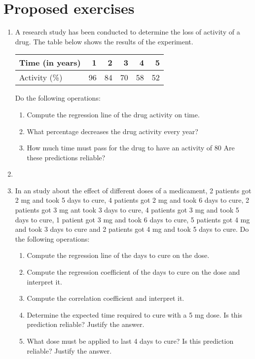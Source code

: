 \section{Proposed exercises}
\begin{enumerate}[leftmargin=*]
\item A research study has been conducted to determine the loss of activity of a drug.
The table below shows the results of the experiment.

\begin{center}
\begin{tabular}{|l|r|r|r|r|r|}
\hline
Time (in years) & 1 & 2 & 3 & 4 & 5 \\ \hline
Activity (\%) & 96 & 84 & 70 & 58 & 52 \\ \hline
\end{tabular}
\end{center}
Do the following operations:
\begin{enumerate}
\item Compute the regression line of the drug activity on time.
\item What percentage decreases the drug activity every year?  
\item How much time must pass for the drug to have an activity of 80%
Are these predictions reliable?
\end{enumerate}

\item \item In an study about the effect of different doses of a medicament, 2 patients got 2 mg and took 5 days to cure, 4
patients got 2 mg and took 6 days to cure, 2 patients got 3 mg ant took 3 days to cure, 4 patients got 3 mg and took 5
days to cure, 1 patient got 3 mg and took 6 days to cure, 5 patients got 4 mg and took 3 days to cure and 2 patients got
4 mg and took 5 days to cure. 
Do the following operations:
\begin{enumerate}
\item Compute the regression line of the days to cure on the dose.
\item Compute the regression coefficient of the days to cure on the dose and interpret it.
\item Compute the correlation coefficient and interpret it.
\item Determine the expected time required to cure with a 5 mg dose.
Is this prediction reliable? Justify the answer.
\item What dose must be applied to last 4 days to cure? 
Is this prediction reliable? Justify the answer.
\end{enumerate}


\end{enumerate}

